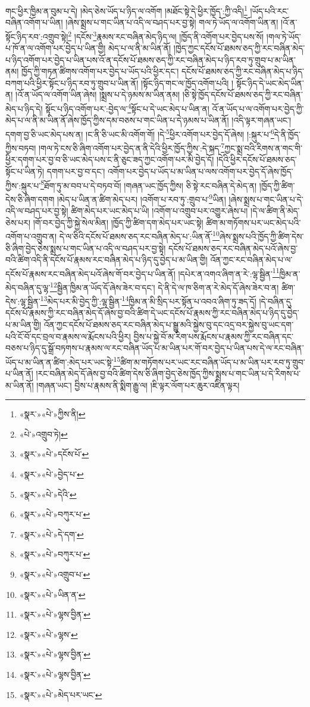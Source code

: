 གང་ཕྱིར་ཁྱིམ་ན་བུམ་པ་དེ། །མེད་ཅེས་ཡོད་པ་ཉིད་ལ་འགོག །མཐོང་སྟེ་དེ་ཕྱིར་ཁྱོད་:ཀྱི་འདི།\footnote{«སྣར་»«པེ་»ཀྱིས་ནི།} །ཡོད་པའི་རང་བཞིན་འགོག་པ་ཡིན། །ཞེས་སྨྲས་པ་གང་ཡིན་པ་འདི་ལ་བཤད་པར་བྱ་སྟེ། གལ་ཏེ་ཡོད་ལ་འགོག་ཡིན་ན། །འོ་ན་སྟོང་ཉིད་རབ་:འགྲུབ་སྟེ།\footnote{«པེ་»འགྲུབ་ཏེ།} །དངོས་\footnote{«སྣར་»«པེ་»དངོས་པོ་}རྣམས་རང་བཞིན་མེད་ཉིད་ལ། །ཁྱོད་ནི་འགོག་པར་བྱེད་པས་སོ། །གལ་ཏེ་ཡོད་པ་ཁོ་ན་ལ་འགོག་པར་བྱེད་པ་ཡིན་གྱི། མེད་པ་ལ་ནི་མ་ཡིན་ནོ། །ཁྱེད་ཀྱང་དངོས་པོ་ཐམས་ཅད་ཀྱི་རང་བཞིན་མེད་པ་ཉིད་འགོག་པར་བྱེད་པ་ཡིན་པས་འོ་ན་དངོས་པོ་ཐམས་ཅད་ཀྱི་རང་བཞིན་མེད་པ་ཉིད་རབ་ཏུ་གྲུབ་པ་མ་ཡིན་ནམ། ཁྱོད་ཀྱི་གཏན་ཚིགས་འགོག་པར་བྱེད་པ་ཡོད་པའི་ཕྱིར་དང་། དངོས་པོ་ཐམས་ཅད་ཀྱི་རང་བཞིན་མེད་པ་ཉིད་བཀག་པའི་ཕྱིར་སྟོང་པ་ཉིད་རབ་ཏུ་གྲུབ་པ་ཡིན་ནོ། །སྟོང་ཉིད་གང་ལ་ཁྱོད་འགོག་པའི། །
སྟོང་ཉིད་དེ་ཡང་མེད་ཡིན་ན། །འོ་ན་ཡོད་ལ་འགོག་ཡིན་ཞེས། །སྨྲས་པ་དེ་ཉམས་མ་ཡིན་ནམ། །ཅི་སྟེ་ཁྱོད་དངོས་པོ་ཐམས་ཅད་ཀྱི་རང་བཞིན་མེད་པ་ཉིད་དེ། སྟོང་པ་ཉིད་འགོག་པར་:བྱེད་ལ་\footnote{«སྣར་»«པེ་»བྱེད་པ་}སྟོང་པ་དེ་ཡང་མེད་པ་ཡིན་ན། འོ་ན་ཡོད་པ་ལ་འགོག་པར་བྱེད་ཀྱི་མེད་པ་ལ་ནི་མ་ཡིན་ནོ་ཞེས་ཁྱོད་ཀྱིས་དམ་བཅས་པ་གང་ཡིན་པ་དེ་ཉམས་པ་ཡིན་ནོ། །འདི་ལྟར་གཞན་ཡང་། དགག་བྱ་ཅི་ཡང་མེད་པས་ན། །ང་ནི་ཅི་ཡང་མི་འགོག་གོ། །དེ་\footnote{«སྣར་»«པེ་»དེའི་}ཕྱིར་འགོག་པར་བྱེད་དོ་ཞེས། །:སྐུར་པ་\footnote{«སྣར་»«པེ་»བཀུར་པ་}དེ་ནི་ཁྱོད་ཀྱིས་བཏབ། །གལ་ཏེ་ངས་ཅི་ཞིག་འགོག་པར་བྱེད་ན་ནི་དེའི་ཕྱིར་ཁྱོད་ཀྱིས་:དེ་སྐད་\footnote{«སྣར་»«པེ་»དེ་དག་}ཀྱང་སྨྲ་བའི་རིགས་ན་གང་གི་ཕྱིར་དགག་པར་བྱ་བ་ཅི་ཡང་མེད་པས་ང་ནི་ཅུང་ཟད་ཀྱང་འགོག་པར་མི་བྱེད་དོ། །དེའི་ཕྱིར་དངོས་པོ་ཐམས་ཅད་སྟོང་པ་ཡིན་ཏེ། དགག་པར་བྱ་བ་དང་། འགོག་པར་བྱེད་པ་ཡོད་པ་མ་ཡིན་པ་ལས་འགོག་པར་བྱེད་དོ་ཞེས་ཁྱོད་ཀྱིས་:སྐུར་པ་\footnote{«སྣར་»«པེ་»བཀུར་པ་}ཐོག་ཏུ་མ་བབ་པ་དེ་བཏབ་བོ། །གཞན་ཡང་ཁྱོད་ཀྱིས། ཅི་སྟེ་རང་བཞིན་དེ་མེད་ན། །ཁྱོད་ཀྱི་ཚིག་དེས་ཅི་ཞིག་དགག །མེད་པ་ཡིན་ན་ཚིག་མེད་པར། །འགོག་པ་རབ་ཏུ་:གྲུབ་པ་\footnote{«སྣར་»«པེ་»འགྲུབ་པ་}ཡིན། །ཞེས་སྨྲས་པ་གང་ཡིན་པ་དེ་འདི་ལ་བཤད་པར་བྱ་སྟེ། ཚིག་མེད་པར་ཡང་མེད་པ་ཡི། །འགོག་པ་འགྲུབ་པར་འགྱུར་ཞེས་པ། །དེ་ལ་ཚིག་ནི་མེད་ཅེས་པར། །གོ་བར་བྱེད་ཀྱི་སྐྱེ་སེལ་མིན། །ཁྱོད་ཀྱི་ཚིག་དག་མེད་པར་ཡང་སྟེ། ཚིག་མ་གཏོགས་པར་ཡང་མེད་པའི་འགོག་པ་འགྲུབ་ན། དེ་ལ་ཅིའི་དངོས་པོ་ཐམས་ཅད་རང་བཞིན་མེད་པ་:ཡིན་ནོ་\footnote{«སྣར་»«པེ་»ཡིན་ན་}ཞེས་སྨྲས་པའི་ཁྱོད་ཀྱི་ཚིག་དེས་ཅི་ཞིག་བྱེད་ཅེས་སྨྲས་པ་གང་ཡིན་པ་འདི་ལ་བཤད་པར་བྱ་སྟེ། དངོས་པོ་ཐམས་ཅད་རང་བཞིན་མེད་པའོ་ཞེས་བྱ་བའི་ཚིག་འདི་ནི་དངོས་པོ་རྣམས་རང་བཞིན་མེད་པ་ཉིད་དུ་བྱེད་པ་མ་ཡིན་གྱི། འོན་ཀྱང་རང་བཞིན་མེད་པ་ལ་དངོས་པོ་རྣམས་རང་བཞིན་མེད་པའོ་ཞེས་གོ་བར་བྱེད་པ་ཡིན་ནོ། །དཔེར་ན་འགའ་ཞིག་ན་རེ་:ལྷ་སྦྱིན་\footnote{«སྣར་»«པེ་»ལྷས་བྱིན་}ཁྱིམ་ན་མེད་བཞིན་དུ་ལྷ་\footnote{«སྣར་»«པེ་»ལྷས་}སྦྱིན་ཁྱིམ་ན་ཡོད་དོ་ཞེས་ཟེར་བ་དང་། དེ་ནི་དེ་ལ་ཁ་ཅིག་ན་རེ་མེད་དོ་ཞེས་ཟེར་བ་ན། ཚིག་དེས་:ལྷ་སྦྱིན་\footnote{«སྣར་»«པེ་»ལྷས་བྱིན་}མེད་པར་མི་བྱེད་ཀྱི་:ལྷ་སྦྱིན་\footnote{«སྣར་»«པེ་»ལྷས་བྱིན་}ཁྱིམ་ན་མི་སྲིད་པར་སྟོན་པ་འབའ་ཞིག་ཏུ་ཟད་དོ། །དེ་བཞིན་དུ་དངོས་པོ་རྣམས་ཀྱི་རང་བཞིན་མེད་དོ་ཞེས་བྱ་བའི་ཚིག་དེ་ཡང་དངོས་པོ་རྣམས་ཀྱི་རང་བཞིན་མེད་པ་ཉིད་དུ་བྱེད་པ་མ་ཡིན་གྱི། འོན་ཀྱང་དངོས་པོ་ཐམས་ཅད་རང་བཞིན་མེད་པ་སྒྱུ་མའི་སྐྱེས་བུ་དང་འདྲ་བར་སྐྱེས་བུ་ཡང་དག་པའི་ངོ་བོ་དང་བྲལ་བ་རྣམས་ལ་རྨོངས་པའི་ཕྱིར། བྱིས་པ་སྐྱེ་བོ་མ་རིག་པས་རྨོངས་པ་རྣམས་ཀྱི་རང་བཞིན་དང་བཅས་པ་ཉིད་དུ་སྒྲོ་བཏགས་པ་རྣམས་ལ་རང་བཞིན་ཡོད་པ་མ་ཡིན་པར་གོ་བར་བྱེད་པ་ཡིན་པས་དེ་ལ་རང་བཞིན་ཡོད་པ་མ་ཡིན་ན་ཚིག་:མེད་པར་ཡང་སྟེ་\footnote{«སྣར་»«པེ་»མེད་པར་ཡང་}ཚིག་མ་གཏོགས་པར་ཡང་རང་བཞིན་ཡོད་པ་མ་ཡིན་པར་རབ་ཏུ་གྲུབ་པ་ཡིན་ནོ། །རང་བཞིན་མེད་དོ་ཞེས་བྱ་བའི་ཚིག་དེས་ཅི་ཞིག་བྱེད་ཅེས་ཁྱོད་ཀྱིས་སྨྲས་པ་གང་ཡིན་པ་དེ་རིགས་པ་མ་ཡིན་ནོ། །གཞན་ཡང་། བྱིས་པ་རྣམས་ནི་སྨིག་རྒྱུ་ལ། །ཇི་ལྟར་ལོག་པར་ཆུར་འཛིན་ལྟར། 